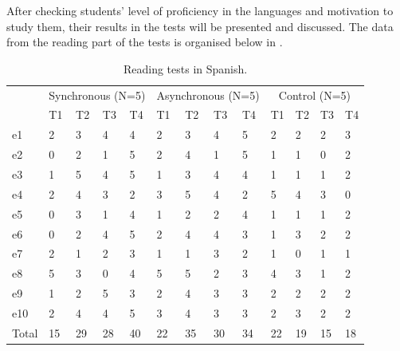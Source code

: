 \documentclass{textolivre}
\begin{document}
After checking students' level of proficiency in the languages and
motivation to study them, their results in the tests will be presented
and discussed. The data from the reading part of the tests is organised
below in .

\begin{table}[htpb]
\caption{Reading tests in Spanish.}
\label{tbl05}
\small
\centering
\begin{tabular}{lllllllllllll}
\toprule
 & \multicolumn{4}{c}{Synchronous (N=5)} & \multicolumn{4}{c}{Asynchronous (N=5)} & \multicolumn{4}{c}{Control (N=5)} \\
 & T1 & T2 & T3 & T4 & T1 & T2 & T3 & T4 & T1 & T2 & T3 & T4 \\
e1 & 2 & 3 & 4 & 4 & 2 & 3 & 4 & 5 & 2 & 2 & 2 & 3 \\
e2 & 0 & 2 & 1 & 5 & 2 & 4 & 1 & 5 & 1 & 1 & 0 & 2 \\
e3 & 1 & 5 & 4 & 5 & 1 & 3 & 4 & 4 & 1 & 1 & 1 & 2 \\ 
e4 & 2 & 4 & 3 & 2 & 3 & 5 & 4 & 2 & 5 & 4 & 3 & 0 \\
e5 & 0 & 3 & 1 & 4 & 1 & 2 & 2 & 4 & 1 & 1 & 1 & 2 \\
e6 & 0 & 2 & 4 & 5 & 2 & 4 & 4 & 3 & 1 & 3 & 2 & 2 \\
e7 & 2 & 1 & 2 & 3 & 1 & 1 & 3 & 2 & 1 & 0 & 1 & 1 \\
e8 & 5 & 3 & 0 & 4 & 5 & 5 & 2 & 3 & 4 & 3 & 1 & 2 \\
e9 & 1 & 2 & 5 & 3 & 2 & 4 & 3 & 3 & 2 & 2 & 2 & 2 \\
e10 & 2 & 4 & 4 & 5 & 3 & 4 & 3 & 3 & 2 & 3 & 2 & 2 \\
Total & 15 & 29 & 28 & 40 & 22 & 35 & 30 & 34 & 22 & 19 & 15 & 18\\
\bottomrule
\end{tabular}
\end{table}
\end{document}
